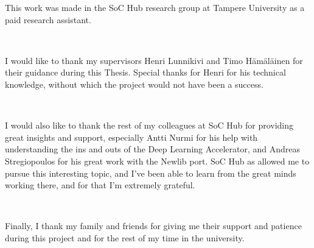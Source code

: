 \noindent This work was made in the SoC Hub research group at Tampere University as a paid research assistant.

~

\noindent I would like to thank my supervisors Henri Lunnikivi and Timo Hämäläinen for their guidance during this Thesis. Special thanks for Henri for his technical knowledge, without which the project would not have been a success.

~

\noindent I would also like to thank the rest of my colleagues at SoC Hub for providing great insights and support, especially Antti Nurmi for his help with understanding the ins and outs of the Deep Learning Accelerator, and Andreas Stregiopoulos for his great work with the Newlib port. SoC Hub as allowed me to pursue this interesting topic, and I've been able to learn from the great minds working there, and for that I'm extremely grateful.

~

\noindent Finally, I thank my family and friends for giving me their support and patience during this project and for the rest of my time in the university.

~
